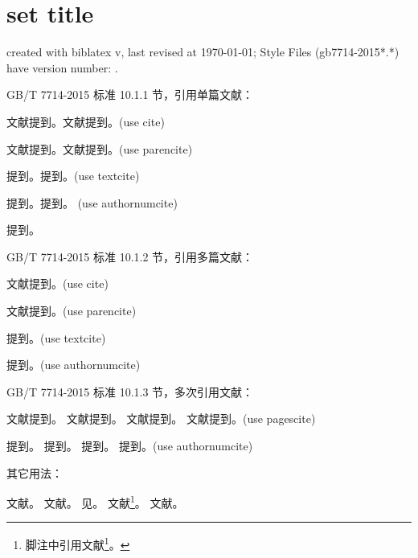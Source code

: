 \documentclass[twoside]{article}
\begin{document}
    \section{set title}
    created with biblatex v\versionofbiblatex, last revised at \today; Style Files (gb7714-2015*.*) have version number: \versionofgbtstyle.

\bigskip
    GB/T 7714-2015 标准 10.1.1 节，引用单篇文献：

    文献\cite{徐伟康2010对}提到。文献\cite{FOURNEY1971-17-38}提到。(use cite)\par
    文献\parencite{徐伟康2010对}提到。文献\parencite{FOURNEY1971-17-38}提到。(use parencite)\par
    \textcite{徐伟康2010对}提到。\textcite{FOURNEY1971-17-38}提到。(use textcite)\par
    提到。提到。
    (use authornumcite)\par
    \textcite{徐伟康2011}提到。

\bigskip
    GB/T 7714-2015 标准 10.1.2 节，引用多篇文献：

    文献\cite{杨光2015经济波动,Yi2013--}提到。(use cite)\par
    文献\parencite{杨光2015经济波动,Yi2013--}提到。(use parencite)\par
    \textcite{杨光2015经济波动,Yi2013--}提到。(use textcite)\par
    提到。(use authornumcite)\par


\bigskip
    GB/T 7714-2015 标准 10.1.3 节，多次引用文献：

    文献提到。
    文献提到。
    文献提到。
    文献提到。(use pagescite)\par
    提到。
    提到。
    提到。
    提到。(use authornumcite)\par

\bigskip
    其它用法：

    文献\cite[见][49页]{杨光2015经济波动}。
    文献\parencite[见][49页]{杨光2015经济波动}。
    见\citeauthor{杨光2015经济波动}\cite{杨光2015经济波动}。
    文献\footnote{脚注中引用文献\footcite{杨光2015经济波动}。}。
    文献。


    \printbibliography

    
\end{document}
